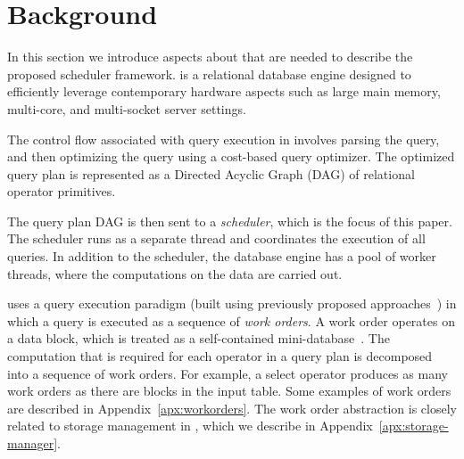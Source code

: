 \section{Background}\label{sec:background}
In this section we introduce aspects about \sys{} that are needed to 
describe the proposed scheduler framework.
\sys{} is a relational database engine 
designed to efficiently leverage contemporary hardware aspects such as large main memory, multi-core, and multi-socket server settings. 

The control flow associated with query execution in \sys{} involves 
parsing the query, and then optimizing the query using a cost-based query 
optimizer.
The optimized query plan is represented as a Directed Acyclic 
Graph (DAG) of relational operator primitives. 

The query plan DAG is then sent to a \textit{scheduler}, which is the focus of this paper. 
The scheduler runs as a separate thread and coordinates the execution of all queries. 
In addition to the scheduler, the database engine has a pool of worker 
threads, where the computations on the data are carried out. 

\sys{} uses a query execution paradigm (built using previously proposed approaches~\cite{qsstorage,morsel}) in which a query is executed as a sequence of \textit{work orders}. 
A work order operates on a data block, which is treated as a self-contained mini-database~\cite{qsstorage}. 
The computation that is required for each operator in a query plan is decomposed into a sequence of work orders. 
For example, a select operator produces as many work orders as there are blocks in the input table. 
Some examples of work orders are described in Appendix~\ref{apx:workorders}.
The work order abstraction is closely related to storage management in \sys{}, which we describe in Appendix~\ref{apx:storage-manager}.